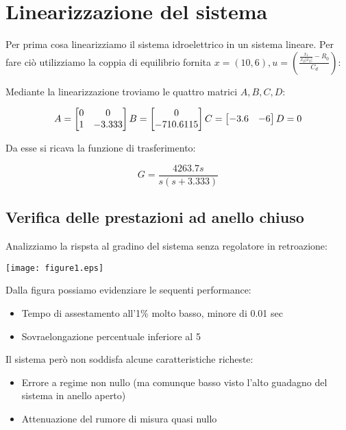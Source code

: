 \documentclass{article}
\begin{document}
\section{Linearizzazione del sistema}

Per prima cosa linearizziamo il sistema idroelettrico in un sistema lineare. Per fare ciò utilizziamo la coppia di equilibrio fornita $x=(10,6), u=(\frac{\frac{x_1}{x_2 |x_2|}-R_0}{C_d})$:

Mediante la linearizzazione troviamo le quattro matrici $A,B,C,D$:

$$
A=
\begin{bmatrix}
    0 & 0\\
    1 & -3.333
\end{bmatrix}
B=
\begin{bmatrix}
    0\\
    -710.6115
\end{bmatrix}\\
C=
\begin{bmatrix}
    -3.6 & -6
\end{bmatrix}
D=0
$$

Da esse si ricava la funzione di trasferimento:

$$
G=\frac{4263.7 s}{s (s+3.333)}
$$

\subsection{Verifica delle prestazioni ad anello chiuso}

Analizziamo la rispsta al gradino del sistema senza regolatore in retroazione:

\begin{center}
    \texttt{[image: figure1.eps]}
\end{center}

Dalla figura possiamo evidenziare le sequenti performance:

\begin{itemize}
    \item Tempo di assestamento all'1\% molto basso, minore di 0.01 sec
    \item Sovraelongazione percentuale inferiore al 5%
\end{itemize}

Il sistema però non soddisfa alcune caratteristiche richeste:

\begin{itemize}
    \item Errore a regime non nullo (ma comunque basso visto l'alto guadagno del sistema in anello aperto)
    \item Attenuazione del rumore di misura quasi nullo
\end{itemize}
\end{document}
